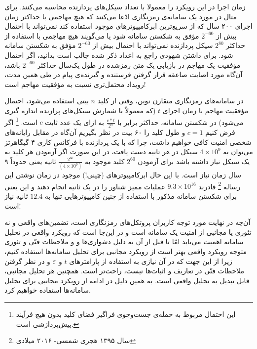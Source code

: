 زمان اجرا در این رویکرد را معمولا با تعداد  سیکل‌های پردازنده محاسبه می‌کنند. برای مثال در مورد یک سامانه‌ی رمزنگاری ادّعا می‌کنند که هیچ مهاجمی با حداکثر زمان اجرای ۲۰۰ سال که از سریع‌ترین ابرکامپیوترهای موجود استفاده کند نمی‌تواند با احتمال بیش از 
$2^{-60}$
مؤفق به شکستن سامانه شود یا می‌گویند هیچ مهاجمی با استفاده از حداکثر 
$2^{80}$
سیکل پردازنده
نمی‌تواند با احتمال بیش از 
$2^{-60}$
مؤفق به شکستن سامانه شود. برای داشتن شهودی راجع به اعداد ذکر شده جالب است بدانید، اگر احتمال مؤفقیت یک مهاجم در بازیابی یک متن رمز‌شده در طول یک‌سال حداکثر 
$2^{-60}$
باشد، آن‌گاه مورد اصابت صاعقه قرار گرفتن فرستنده و گیرنده‌ی پیام در طی همین مدت، رویداد محتمل‌تری نسبت به مؤفقیت مهاجم است!
\begin{example}
	در سامانه‌های رمزنگاری متقارن نوین،  وقتی از کلید 
	$n$
	بیتی استفاده می‌شود، احتمال مؤفقیت مهاجم با زمان اجرای 
	$t$
	(که معمولاً با شمارش سیکل‌های پرازنده اندازه گیری می‌شود) در شکستن سامانه،  حداکثر برابر با 
	$\frac{c*t}{2^{n}}$
	 به ازای یک عدد ثابت 
	 $c$
	 است. 
	 \footnote{این احتمال مربوط به حمله‌ی جست‌وجوی فراگیر فضای کلید بدون هیچ فرآیند پیش‌پردازشی است.}
	  اگر فرض کنیم 
	  $c = 1$
	  و طول کلید را ۶۰ بیت در نظر بگیریم آن‌گاه در مقابل رایانه‌های شخصی امنیت کافی خواهیم داشت، چرا که با یک پردازنده با فرکانس کاری ۴ گیگاهرتز می‌توان به 
	  $4\times 10^{9}$
	  سیکل در هر ثانیه دست یافت، در این صورت اگر آزمودن هر کلید به یک سیکل نیاز داشته باشد برای آزمودن 
	  $2^{60}$
	  کلید موجود به 
	  $\frac{2^{60}}{(4\times 10^{9})}$
	  ثانیه یعنی حدوداً ۹ سال زمان نیاز است. با این حال ابرکامپیوترهای (چینی!) موجود در زمان نوشتن این رساله
	  \footnote{سال ۱۳۹۵ هجری شمسی- ۲۰۱۶ میلادی}
	  قادرند 
	  $9.3\times 10^{16}$
	  عملیات ممیز شناور را در یک ثانیه انجام دهند و این یعنی برای شکستن سامانه مذکور با استفاده از چنین کامپیوترهایی تنها به 
	  $12.4$
	   ثانیه نیاز است!  
\end{example}
آن‌چه در نهایت مورد توجه  کاربران پروتکل‌های رمزنگاری است، تضمین‌های واقعی و نه تئوری  یا مجانبی از امنیت یک سامانه است و در این‌جا است که رویکرد واقعی در تحلیل سامانه اهمیت می‌یابد امّا تا قبل از آن به دلیل دشواری‌ها و و ملاحظات فنّی و تئوری متوجه رویکرد واقعی بهتر است از رویکرد مجانبی برای تحلیل سامانه‌ها استفاده کنیم، زیرا از این جهت که در آن نیازی به استفاده از پارامترهای 
$t$
و 
$\varepsilon$
و در نظر گرفتن ملاحظات فنّی در تعاریف و اثبات‌ها نیست، راحت‌تر است. همچنین هر تحلیل مجانبی، قابل تبدیل به تحلیل واقعی است. به همین دلیل در ادامه از رویکرد مجانبی برای تحلیل سامانه‌ها استفاده خواهیم کرد. 
